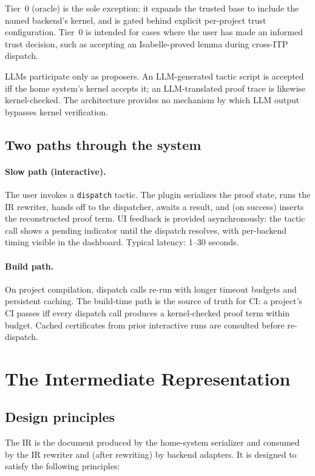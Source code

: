 \documentclass[11pt,letterpaper]{article}
\theoremstyle{definition}
\theoremstyle{remark}
\begin{document}
Tier~0 (oracle) is the sole exception: it expands the trusted base to
include the named backend's kernel, and is gated behind explicit per-project
trust configuration. Tier~0 is intended for cases where the user has made
an informed trust decision, such as accepting an Isabelle-proved lemma
during cross-ITP dispatch.

LLMs participate only as proposers. An LLM-generated tactic script is
accepted iff the home system's kernel accepts it; an LLM-translated proof
trace is likewise kernel-checked. The architecture provides no mechanism
by which LLM output bypasses kernel verification.

\subsection{Two paths through the system}

\paragraph{Slow path (interactive).} The user invokes a \texttt{dispatch}
tactic. The plugin serializes the proof state, runs the IR rewriter, hands
off to the dispatcher, awaits a result, and (on success) inserts the
reconstructed proof term. UI feedback is provided asynchronously: the
tactic call shows a pending indicator until the dispatch resolves, with
per-backend timing visible in the dashboard. Typical latency: 1--30
seconds.

\paragraph{Build path.} On project compilation, dispatch calls re-run with
longer timeout budgets and persistent caching. The build-time path is the
source of truth for CI: a project's CI passes iff every dispatch call
produces a kernel-checked proof term within budget. Cached certificates
from prior interactive runs are consulted before re-dispatch.

\section{The Intermediate Representation}
\label{sec:ir}

\subsection{Design principles}

The IR is the document produced by the home-system serializer and consumed
by the IR rewriter and (after rewriting) by backend adapters. It is
designed to satisfy the following principles:
\end{document}
